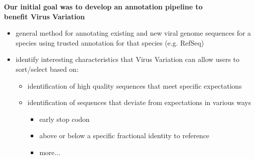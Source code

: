 \documentclass[landscape]{slides}
\begin{document}
\begin{slide}
\begin{center}
\textbf{Our initial goal was to develop an annotation pipeline to \\ benefit Virus Variation}

\small
\begin{itemize}
\item general method for annotating existing and new viral genome
  sequences for a species using trusted annotation for that species (e.g. RefSeq)
\item identify interesting characteristics that Virus Variation can
  allow users to sort/select based on:
\begin{itemize}
  \item identification of high quality sequences that meet specific expectations
  \item identification of sequences that deviate from expectations in
    various ways
    \begin{itemize}
      \item early stop codon
      \item above or below a specific fractional identity to reference 
      \item more...
    \end{itemize}
\end{itemize}
\end{itemize}

\end{center}
\vfill
\end{slide}
\end{document}
